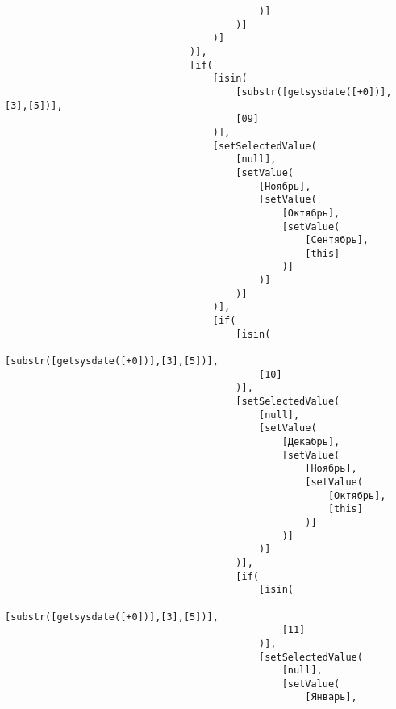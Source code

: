 \documentclass[../index.tex]{subfiles}
\begin{document}
\begin{verbatim}
                                            )]
                                        )]
                                    )]
                                )],
                                [if(
                                    [isin(
                                        [substr([getsysdate([+0])],[3],[5])],
                                        [09]
                                    )],
                                    [setSelectedValue(
                                        [null],
                                        [setValue(
                                            [Ноябрь],
                                            [setValue(
                                                [Октябрь],
                                                [setValue(
                                                    [Сентябрь],
                                                    [this]
                                                )]
                                            )]
                                        )]
                                    )],
                                    [if(
                                        [isin(
                                            [substr([getsysdate([+0])],[3],[5])],
                                            [10]
                                        )],
                                        [setSelectedValue(
                                            [null],
                                            [setValue(
                                                [Декабрь],
                                                [setValue(
                                                    [Ноябрь],
                                                    [setValue(
                                                        [Октябрь],
                                                        [this]
                                                    )]
                                                )]
                                            )]
                                        )],
                                        [if(
                                            [isin(
                                                [substr([getsysdate([+0])],[3],[5])],
                                                [11]
                                            )],
                                            [setSelectedValue(
                                                [null],
                                                [setValue(
                                                    [Январь],

\end{verbatim}
\end{document}
